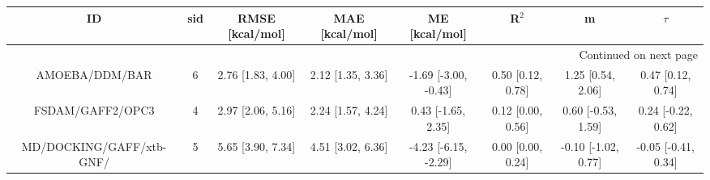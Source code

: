 \documentclass[8pt]{article}
\begin{document}
\begin{center}
\begin{footnotesize}
\begin{longtable}{|cccccccc|}
\toprule
                       ID & sid &    RMSE [kcal/mol] &     MAE [kcal/mol] &         ME [kcal/mol] &              R$^2$ &                    m &               $\tau$ \\
\midrule
\endhead
\midrule
\multicolumn{8}{r}{{Continued on next page}} \\
\midrule
\endfoot

\bottomrule
\endlastfoot
           AMOEBA/DDM/BAR &   6 &  2.76 [1.83, 4.00] &  2.12 [1.35, 3.36] &  -1.69 [-3.00, -0.43] &  0.50 [0.12, 0.78] &    1.25 [0.54, 2.06] &    0.47 [0.12, 0.74] \\
         FSDAM/GAFF2/OPC3 &   4 &  2.97 [2.06, 5.16] &  2.24 [1.57, 4.24] &    0.43 [-1.65, 2.35] &  0.12 [0.00, 0.56] &   0.60 [-0.53, 1.59] &   0.24 [-0.22, 0.62] \\
 MD/DOCKING/GAFF/xtb-GNF/ &   5 &  5.65 [3.90, 7.34] &  4.51 [3.02, 6.36] &  -4.23 [-6.15, -2.29] &  0.00 [0.00, 0.24] &  -0.10 [-1.02, 0.77] &  -0.05 [-0.41, 0.34] \\
\end{longtable}
\end{footnotesize}
\end{center}
\end{document}
